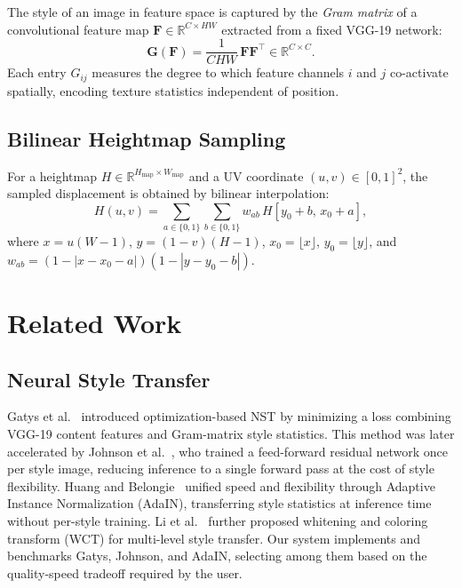 \documentclass[conference]{IEEEtran}
\newcommand{\R}{\mathbb{R}}
\begin{document}
The style of an image in feature space is captured by the \emph{Gram matrix}
of a convolutional feature map $\mathbf{F} \in \R^{C \times HW}$ extracted
from a fixed VGG-19 network:
\begin{equation}
  \mathbf{G}(\mathbf{F}) = \frac{1}{CHW}\,\mathbf{F}\mathbf{F}^\top \in \R^{C\times C}.
  \label{eq:gram}
\end{equation}
Each entry $G_{ij}$ measures the degree to which feature channels $i$ and
$j$ co-activate spatially, encoding texture statistics independent of position.

\subsection{Bilinear Heightmap Sampling}

For a heightmap $H \in \R^{H_{\text{map}} \times W_{\text{map}}}$ and a UV
coordinate $(u,v) \in [0,1]^2$, the sampled displacement is obtained by
bilinear interpolation:
\begin{equation}
  H(u,v) = \sum_{a\in\{0,1\}}\sum_{b\in\{0,1\}}
    w_{ab}\,H\!\left[y_0+b,\,x_0+a\right],
  \label{eq:bilinear}
\end{equation}
where $x = u(W-1)$, $y = (1-v)(H-1)$, $x_0=\lfloor x\rfloor$,
$y_0=\lfloor y\rfloor$, and $w_{ab}=(1-|x-x_0-a|)(1-|y-y_0-b|)$.

\section{Related Work}

\subsection{Neural Style Transfer}

Gatys et al.~\cite{b4} introduced optimization-based NST by minimizing a
loss combining VGG-19 content features and Gram-matrix style statistics.
This method was later accelerated by Johnson et al.~\cite{b5}, who trained
a feed-forward residual network once per style image, reducing inference to a
single forward pass at the cost of style flexibility. Huang and
Belongie~\cite{b6} unified speed and flexibility through Adaptive Instance
Normalization (AdaIN), transferring style statistics at inference time without
per-style training. Li et al.~\cite{b18} further proposed whitening and
coloring transform (WCT) for multi-level style transfer. Our system implements
and benchmarks Gatys, Johnson, and AdaIN, selecting among them based on the
quality-speed tradeoff required by the user.
\end{document}
